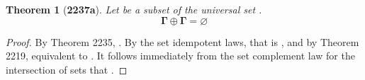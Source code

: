 \documentclass[preview]{standalone}
\newtheorem*{theorem*}{Theorem}
\begin{document}
\begin{theorem*}[\textbf{2237a}] \color{black}
    Let \bm{$\Gamma$} be a subset of the universal set \bm{$\Omega$}. 
    \begin{equation*}
        \bm{\Gamma \oplus \Gamma = \varnothing}
    \end{equation*}
\end{theorem*}
\begin{proof} \color{black}
    By Theorem 2235, 
    \bm{$
    \Gamma \oplus \Gamma 
        = 
    \big \langle \Gamma \cup \Gamma \big \rangle
        - 
    \big \langle \Gamma \cap \Gamma \big \rangle
    $}. 
    By the set idempotent laws, 
    that is \bm{$\Gamma - \Gamma$}, 
    and by Theorem 2219, equivalent to 
    \bm{$\Gamma \cap \overline{\Gamma}$}. 
    It follows immediately from the set complement law for the intersection of sets that 
    \bm{$\Gamma \oplus \Gamma = \varnothing$}.
\color{lightgray} \end{proof}
\end{document}
